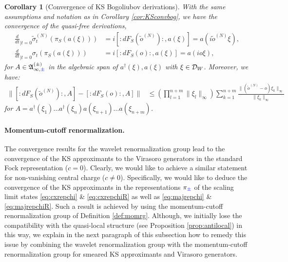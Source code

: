 \documentclass[a4paper, 11pt]{article}
\newcommand{\fA}{\mathfrak{A}}\newcommand{\cA}{\mathcal{A}}\newcommand{\dA}{\mathds{A}}\newcommand{\sA}{\mathscr{A}}
\DeclareMathOperator{\1}{\mathds{1}}
\newtheorem{cor}[thm]{Corollary}
\begin{document}
\begin{cor}[Convergence of KS Bogoliubov derivations]
\label{cor:KSderivationconv}
With the same assumptions and notation as in Corollary \ref{cor:KSconvbog}, we have the convergence of the quasi-free derivations,
\begin{align*}
\tfrac{d}{dt}_{|t=0}\tilde{\sigma}^{(N)}_{t}(\pi_{S}(a(\xi))) & = i[:\!dF_{S}(\tilde{o}^{(N)})\!:,a(\xi)] = a(i\tilde{o}^{(N)}\xi), \\
\tfrac{d}{dt}_{|t=0}\sigma_{t}(\pi_{S}(a(\xi))) & = i[:\!dF_{S}(o)\!:,a(\xi)] = a(io\xi),
\end{align*}
for $A\in\fA^{(\pm)}_{\infty,{\color{blue}\pm}}$ in the algebraic span of $a^{\dag}(\xi), a(\xi)$ with $\xi\in\mathcal{D}_{W}$. Moreover, we have:
\begin{align}
\label{eq:KSmultiestimatederivation}
\|[:\!dF_{S}(\tilde{o}^{(N)})\!:,A] - [:\!dF_{S}(o)\!:,A]\| & \leq \left(\prod_{l=1}^{n+m}\|\xi_{l}\|_{\infty}\right)\sum_{k=1}^{n+m}\frac{\|(\tilde{o}^{(N)} - o)\xi_{k}\|_{\infty}}{\|\xi_{k}\|_{\infty}}\;
\end{align}
for $A = a^{\dagger}(\xi_{1})\dots a^{\dagger}(\xi_{n})a(\xi_{n+1})\dots a(\xi_{n+m})$.
\end{cor}

\paragraph{Momentum-cutoff renormalization.}
\label{sec:momconv}
The convergence results for the wavelet renormalization group lead to the convergence of the KS approximants to the Virasoro generators in the standard Fock representation ($c=0$). Clearly, we would like to achieve a similar statement for non-vanishing central charge ($c\neq 0$). Specifically, we would like to deduce the convergence of the KS approximants in the representations $\pi_{{\color{blue}\pm}}$ of the scaling limit states \eqref{eq:cxrepchi} \& \eqref{eq:cxrepchiR} as well as \eqref{eq:majrepchi} \& \eqref{eq:majrepchiR}. Such a result is achieved by using the momentum-cutoff renormalization group of Definition \ref{def:momrg}. Although, we initially lose the compatibility with the quasi-local structure (see Proposition \ref{prop:antilocal}) in this way, we explain in the next paragraph of this subsection how to remedy this issue by combining the wavelet renormalization group with the momentum-cutoff renormalization group for smeared KS approximants and Virasoro generators.
\end{document}

